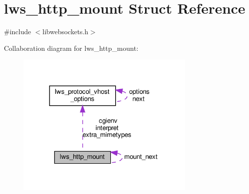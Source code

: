\hypertarget{structlws__http__mount}{}\section{lws\+\_\+http\+\_\+mount Struct Reference}
\label{structlws__http__mount}


{\ttfamily \#include $<$libwebsockets.\+h$>$}



Collaboration diagram for lws\+\_\+http\+\_\+mount\+:
\nopagebreak
\begin{figure}[H]
\begin{center}
\leavevmode
\includegraphics[width=247pt]{structlws__http__mount__coll__graph}
\end{center}
\end{figure}
